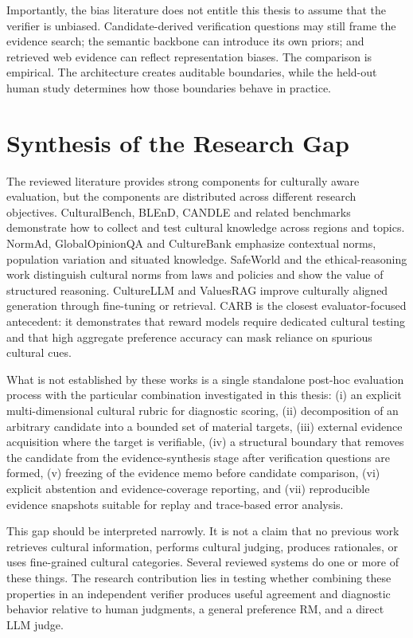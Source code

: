 Importantly, the bias literature does not entitle this thesis to assume that the verifier is unbiased. Candidate-derived verification questions may still frame the evidence search; the semantic backbone can introduce its own priors; and retrieved web evidence can reflect representation biases. The comparison is empirical. The architecture creates auditable boundaries, while the held-out human study determines how those boundaries behave in practice.

\section{Synthesis of the Research Gap}
\label{sec:research-gap}

The reviewed literature provides strong components for culturally aware evaluation, but the components are distributed across different research objectives. CulturalBench, BLEnD, CANDLE and related benchmarks demonstrate how to collect and test cultural knowledge across regions and topics. NormAd, GlobalOpinionQA and CultureBank emphasize contextual norms, population variation and situated knowledge. SafeWorld and the ethical-reasoning work distinguish cultural norms from laws and policies and show the value of structured reasoning. CultureLLM and ValuesRAG improve culturally aligned generation through fine-tuning or retrieval. CARB is the closest evaluator-focused antecedent: it demonstrates that reward models require dedicated cultural testing and that high aggregate preference accuracy can mask reliance on spurious cultural cues.

What is not established by these works is a single standalone post-hoc evaluation process with the particular combination investigated in this thesis: (i) an explicit multi-dimensional cultural rubric for diagnostic scoring, (ii) decomposition of an arbitrary candidate into a bounded set of material targets, (iii) external evidence acquisition where the target is verifiable, (iv) a structural boundary that removes the candidate from the evidence-synthesis stage after verification questions are formed, (v) freezing of the evidence memo before candidate comparison, (vi) explicit abstention and evidence-coverage reporting, and (vii) reproducible evidence snapshots suitable for replay and trace-based error analysis.

This gap should be interpreted narrowly. It is not a claim that no previous work retrieves cultural information, performs cultural judging, produces rationales, or uses fine-grained cultural categories. Several reviewed systems do one or more of these things. The research contribution lies in testing whether combining these properties in an independent verifier produces useful agreement and diagnostic behavior relative to human judgments, a general preference RM, and a direct LLM judge.

